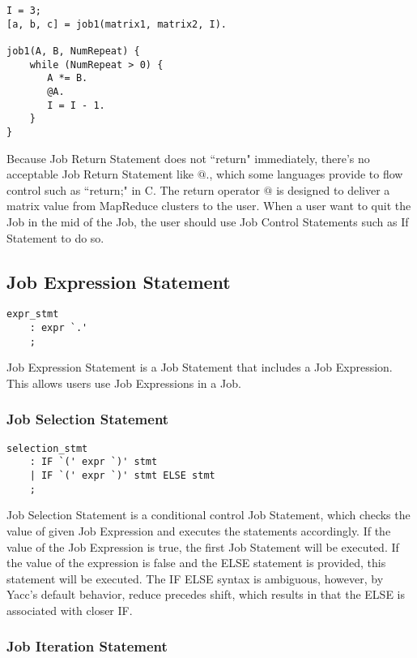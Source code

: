 \documentclass[prodmode,acmtecs]{acmsmall}
\begin{document}
\begin{lstlisting}
I = 3;
[a, b, c] = job1(matrix1, matrix2, I).

job1(A, B, NumRepeat) {
    while (NumRepeat > 0) {
       A *= B.
       @A.
       I = I - 1. 
    }
}
\end{lstlisting}

Because Job Return Statement does not ``return" immediately,
there's no acceptable Job Return Statement like $@.$, which some
languages provide to flow control such as ``return;" in C.  The
return operator $@$ is designed to deliver a matrix value from
MapReduce clusters to the user.  When a user want to quit the Job
in the mid of the Job, the user should use Job Control Statements
such as If Statement to do so.


\subsection{Job Expression Statement}

\begin{lstlisting}
expr_stmt
	: expr `.'
	;
\end{lstlisting}

Job Expression Statement is a Job Statement that includes a Job
Expression.  This allows users use Job Expressions in a Job.

\subsubsection{Job Selection Statement}

\begin{lstlisting}
selection_stmt
	: IF `(' expr `)' stmt
	| IF `(' expr `)' stmt ELSE stmt
	;
\end{lstlisting}

Job Selection Statement is a conditional control Job Statement,
which checks the value of given Job Expression and executes the
statements accordingly.  If the value of the Job Expression is
true, the first Job Statement will be executed.  If the value of
the expression is false and the ELSE statement is provided, this
statement will be executed.  The IF ELSE syntax is ambiguous,
however, by Yacc's default behavior, reduce precedes shift, which
results in that the ELSE is associated with closer IF.

\subsubsection{Job Iteration Statement}
\end{document}
